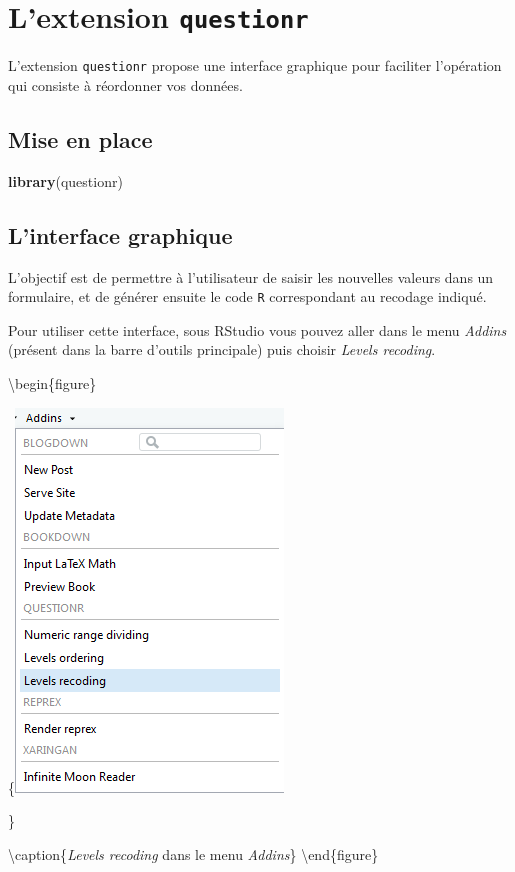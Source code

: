 \documentclass[]{book}
\newenvironment{Shaded}{\begin{snugshade}}{\end{snugshade}}
\newcommand{\KeywordTok}[1]{\textcolor[rgb]{0.13,0.29,0.53}{\textbf{#1}}}
\newcommand{\NormalTok}[1]{#1}
\theoremstyle{definition}
\theoremstyle{definition}
\theoremstyle{definition}
\theoremstyle{remark}
\begin{document}
\hypertarget{lextension-questionr}{%
\section{\texorpdfstring{L'extension
\texttt{questionr}}{L'extension questionr}}\label{lextension-questionr}}

L'extension \texttt{questionr} propose une interface graphique pour
faciliter l'opération qui consiste à réordonner vos données.

\hypertarget{mise-en-place-2}{%
\subsection{Mise en place}\label{mise-en-place-2}}

\begin{Shaded}
\begin{Highlighting}[]
\KeywordTok{library}\NormalTok{(questionr)}
\end{Highlighting}
\end{Shaded}

\hypertarget{linterface-graphique}{%
\subsection{L'interface graphique}\label{linterface-graphique}}

L'objectif est de permettre à l'utilisateur de saisir les nouvelles
valeurs dans un formulaire, et de générer ensuite le code \texttt{R}
correspondant au recodage indiqué.

Pour utiliser cette interface, sous RStudio vous pouvez aller dans le
menu \emph{Addins} (présent dans la barre d'outils principale) puis
choisir \emph{Levels recoding}.

\textbackslash{}begin\{figure\}

\{\centering \includegraphics[width=0.25\linewidth]{images/addin-irec}

\}

\textbackslash{}caption\{\emph{Levels recoding} dans le menu
\emph{Addins}\}\label{fig:addin-irec} \textbackslash{}end\{figure\}
\end{document}
